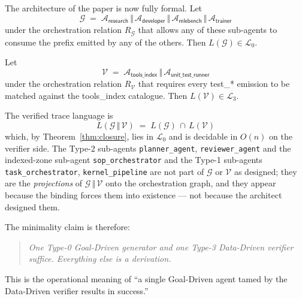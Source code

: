 The architecture of the paper is now fully formal.  Let
\[
\mathcal{G} \;=\; \mathcal{A}_{\textsf{research}}
            \,\Vert\, \mathcal{A}_{\textsf{developer}}
            \,\Vert\, \mathcal{A}_{\textsf{mlebench}}
            \,\Vert\, \mathcal{A}_{\textsf{trainer}}
\]
under the orchestration relation $R_\mathcal{G}$ that allows any
of these sub-agents to consume the prefix emitted by any of the
others.  Then $L(\mathcal{G}) \in \mathcal{L}_0$.

Let
\[
\mathcal{V} \;=\; \mathcal{A}_{\textsf{tools\_index}}
            \,\Vert\, \mathcal{A}_{\textsf{unit\_test\_runner}}
\]
under the orchestration relation $R_\mathcal{V}$ that requires
every \textsf{test\_*} emission to be matched against the
\textsf{tools\_index} catalogue.  Then $L(\mathcal{V}) \in
\mathcal{L}_3$.

The verified trace language is
\[
L(\mathcal{G}\,\Vert\,\mathcal{V})
\;=\; L(\mathcal{G}) \,\cap\, L(\mathcal{V})
\]
which, by Theorem~\ref{thm:closure}, lies in $\mathcal{L}_0$ and
is decidable in $O(n)$ on the verifier side.  The Type-2
sub-agents \texttt{planner\_agent}, \texttt{reviewer\_agent} and
the indexed-zone sub-agent \texttt{sop\_orchestrator} and the
Type-1 sub-agents \texttt{task\_orchestrator},
\texttt{kernel\_pipeline} are not part of $\mathcal{G}$ or
$\mathcal{V}$ as designed; they are the \emph{projections} of
$\mathcal{G}\,\Vert\,\mathcal{V}$ onto the orchestration graph,
and they appear because the binding forces them into existence ---
not because the architect designed them.

The minimality claim is therefore:
\begin{quote}
\emph{One Type-0 Goal-Driven generator and one Type-3
Data-Driven verifier suffice.  Everything else is a derivation.}
\end{quote}

This is the operational meaning of ``a single Goal-Driven agent
tamed by the Data-Driven verifier results in success.''
